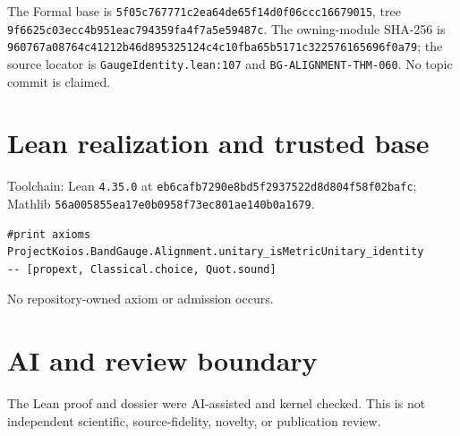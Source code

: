 \documentclass[10pt]{article}
\begin{document}
The Formal base is \texttt{5f05c767771c2ea64de65f14d0f06ccc16679015}, tree
\texttt{9f6625c03ecc4b951eac794359fa4f7a5e59487c}. The owning-module SHA-256 is
\texttt{960767a08764c41212b46d895325124c4c10fba65b5171c322576165696f0a79}; the source locator is
\texttt{GaugeIdentity.lean:107} and \texttt{BG-ALIGNMENT-THM-060}. No topic commit is claimed.

\section{Lean realization and trusted base}
Toolchain: Lean \texttt{4.35.0} at
\texttt{eb6cafb7290e8bd5f2937522d8d804f58f02bafc}; Mathlib
\texttt{56a005855ea17e0b0958f73ec801ae140b0a1679}.
\begin{verbatim}
#print axioms ProjectKoios.BandGauge.Alignment.unitary_isMetricUnitary_identity
-- [propext, Classical.choice, Quot.sound]
\end{verbatim}
No repository-owned axiom or admission occurs.

\section{AI and review boundary}
The Lean proof and dossier were AI-assisted and kernel checked. This is not independent scientific,
source-fidelity, novelty, or publication review.
\end{document}
